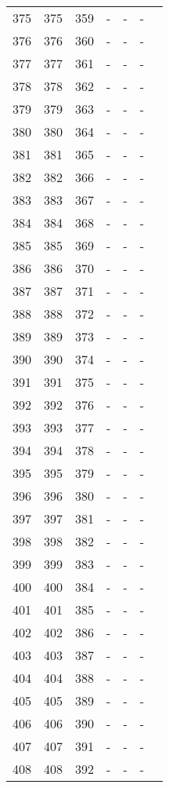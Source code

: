 \begin{longtable}{rrrllll}
  375 & 375 & 359 & - & - & - &  \\ 
  376 & 376 & 360 & - & - & - &  \\ 
  377 & 377 & 361 & - & - & - &  \\ 
  378 & 378 & 362 & - & - & - &  \\ 
  379 & 379 & 363 & - & - & - &  \\ 
  380 & 380 & 364 & - & - & - &  \\ 
  381 & 381 & 365 & - & - & - &  \\ 
  382 & 382 & 366 & - & - & - &  \\ 
  383 & 383 & 367 & - & - & - &  \\ 
  384 & 384 & 368 & - & - & - &  \\ 
  385 & 385 & 369 & - & - & - &  \\ 
  386 & 386 & 370 & - & - & - &  \\ 
  387 & 387 & 371 & - & - & - &  \\ 
  388 & 388 & 372 & - & - & - &  \\ 
  389 & 389 & 373 & - & - & - &  \\ 
  390 & 390 & 374 & - & - & - &  \\ 
  391 & 391 & 375 & - & - & - &  \\ 
  392 & 392 & 376 & - & - & - &  \\ 
  393 & 393 & 377 & - & - & - &  \\ 
  394 & 394 & 378 & - & - & - &  \\ 
  395 & 395 & 379 & - & - & - &  \\ 
  396 & 396 & 380 & - & - & - &  \\ 
  397 & 397 & 381 & - & - & - &  \\ 
  398 & 398 & 382 & - & - & - &  \\ 
  399 & 399 & 383 & - & - & - &  \\ 
  400 & 400 & 384 & - & - & - &  \\ 
  401 & 401 & 385 & - & - & - &  \\ 
  402 & 402 & 386 & - & - & - &  \\ 
  403 & 403 & 387 & - & - & - &  \\ 
  404 & 404 & 388 & - & - & - &  \\ 
  405 & 405 & 389 & - & - & - &  \\ 
  406 & 406 & 390 & - & - & - &  \\ 
  407 & 407 & 391 & - & - & - &  \\ 
  408 & 408 & 392 & - & - & - &  \\ 

\end{longtable}
